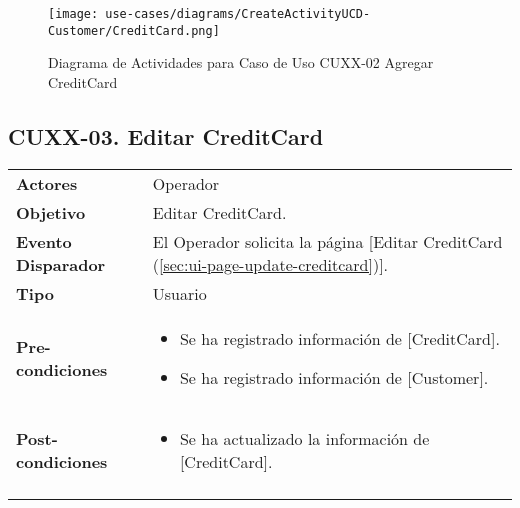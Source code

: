 	\begin{figure}[H]
		\begin{center}
			\label{tab:activity-create-ucd-entity-creditcard}
			\texttt{[image: use-cases/diagrams/CreateActivityUCD-Customer/CreditCard.png]}
			\caption{Diagrama de Actividades para Caso de Uso CUXX-02 Agregar CreditCard}	
	    \end{center}
	\end{figure}
			
	
	\clearpage
	\subsection{CUXX-03. Editar CreditCard} \label{sec:cu-update-CreditCard}
	
	\begin{tabular}{ p{3.5cm} p{11.5cm} }
		\textbf{Actores} & Operador\\
		\textbf{Objetivo} & Editar CreditCard.\\
		\textbf{Evento Disparador} & El Operador solicita la p\'agina [Editar CreditCard (\ref{sec:ui-page-update-creditcard})].\\
		\textbf{Tipo} & Usuario\\
		\textbf{Pre-condiciones} &
			\begin{minipage}[t]{0.6\textwidth}
			\begin{itemize}[noitemsep,nolistsep]
			\setlength{\itemindent}{-.5cm}
				\item Se ha registrado informaci\'on de [CreditCard].
				\item Se ha registrado informaci\'on de [Customer].
			\end{itemize}
			\end{minipage} \\
		\textbf{Post-condiciones} &
			\begin{minipage}[t]{0.6\textwidth}
			\begin{itemize}[noitemsep,nolistsep]
			\setlength{\itemindent}{-.5cm}
				\item Se ha actualizado la informaci\'on de [CreditCard].
			\end{itemize}
			\end{minipage} \\
		\\
	\end{tabular}
	
